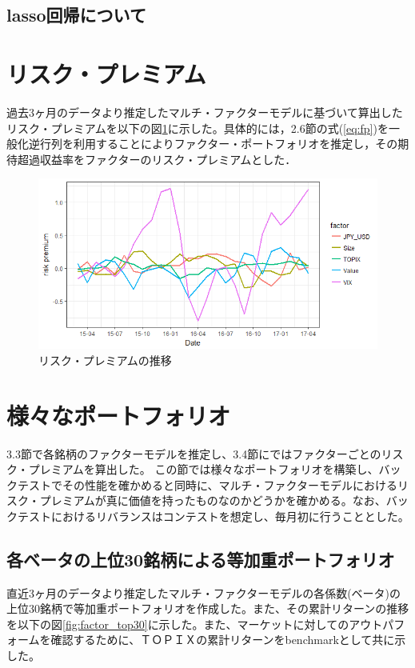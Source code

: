 \documentclass[11pt]{jreport}
\begin{document}
\subsection{lasso回帰について}
\section{リスク・プレミアム}
過去3ヶ月のデータより推定したマルチ・ファクターモデルに基づいて算出したリスク・プレミアムを以下の図\ref{fig:riskpremium}に示した。具体的には，2.6節の式(\ref{eq:fp})を一般化逆行列を利用することによりファクター・ポートフォリオを推定し，その期待超過収益率をファクターのリスク・プレミアムとした．

\begin{figure}[H]
	\begin{center}
		\includegraphics[width=15cm]{./fig/riskpremium.png}
		\caption{リスク・プレミアムの推移}
		\label{fig:riskpremium}
	\end{center}
\end{figure}
\section{様々なポートフォリオ}
3.3節で各銘柄のファクターモデルを推定し、3.4節にではファクターごとのリスク・プレミアムを算出した。
この節では様々なポートフォリオを構築し、バックテストでその性能を確かめると同時に、マルチ・ファクターモデルにおけるリスク・プレミアムが真に価値を持ったものなのかどうかを確かめる。なお、バックテストにおけるリバランスはコンテストを想定し、毎月初に行うこととした。

\subsection{各ベータの上位30銘柄による等加重ポートフォリオ}
直近3ヶ月のデータより推定したマルチ・ファクターモデルの各係数(ベータ)の上位30銘柄で等加重ポートフォリオを作成した。また、その累計リターンの推移を以下の図\ref{fig:factor_top30}に示した。また、マーケットに対してのアウトパフォームを確認するために、ＴＯＰＩＸの累計リターンをbenchmarkとして共に示した。
\end{document}
